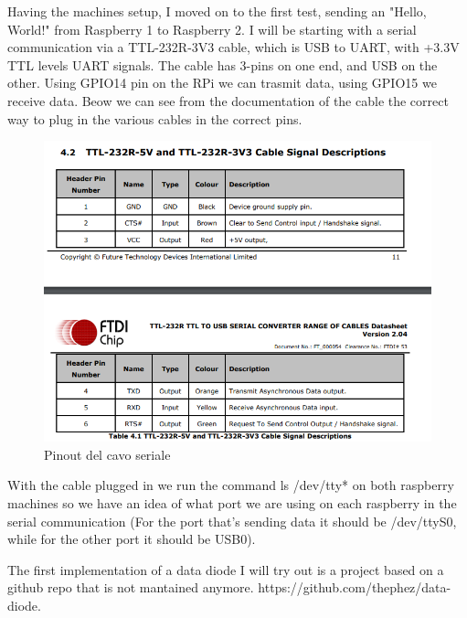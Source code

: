 \documentclass[a4paper,11pt]{scrartcl}
\begin{document}
Having the machines setup, I moved on to the first test, sending an "Hello, World!" from Raspberry 1 to Raspberry 2. I will be starting with a serial communication via a TTL-232R-3V3 cable, which is USB to UART, with +3.3V TTL levels UART signals. The cable has 3-pins on one end, and USB on the other. Using GPIO14 pin on the RPi we can trasmit data, using GPIO15 we receive data. 
Beow we can see from the documentation of the cable the correct way to plug in the various cables in the correct pins.
\begin{figure}[htbp]
\centerline{\includegraphics{pinout uart.png}}
\caption{Pinout del cavo seriale}
\label{fig2}
\end{figure}

With the cable plugged in we run the command ls /dev/tty* on both raspberry machines so we have an idea of what port we are using on each raspberry in the serial communication (For the port that's sending data it should be /dev/ttyS0, while for the other port it should be USB0).

The first implementation of a data diode I will try out is a project based on a github repo that is not mantained anymore. https://github.com/thephez/data-diode.
\end{document}
